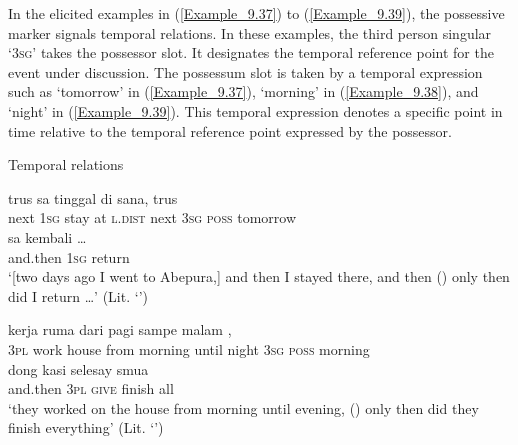 In the elicited examples in (\ref{Example_9.37}) to (\ref{Example_9.39}), the possessive marker signals temporal  relations. In these examples, the third person singular   ‘\textsc{3sg}’ takes the possessor slot. It designates the temporal reference point for the event under discussion. The possessum slot is taken by a temporal expression such as  ‘tomorrow’ in (\ref{Example_9.37}),  ‘morning’ in (\ref{Example_9.38}), and  ‘night’ in (\ref{Example_9.39}). This temporal expression denotes a specific point in time relative to the temporal reference point expressed by the possessor.



\begin{styleExampleTitle}
Temporal  relations
\end{styleExampleTitle}

\ea
\label{Example_9.37}
\gll {\ldots} {trus} {{sa}} {{tinggal}} {{di}} {sana,} {trus} {} {} {}\\ %
 { }  next  {\textsc{1sg}}  {stay}  {at}  \textsc{l.dist}  next  \textsc{3sg}  \textsc{poss}  tomorrow\\
  {sa}  {kembali}  {\ldots}\\
 {and.then}  {\textsc{1sg}}  {return}  {}\\
\glt 
‘[two days ago I went to Abepura,] and then I stayed there, and then  ()  only then did I return {\ldots}’ (Lit. ‘’) \textstyleExampleSource{[Elicited BR111020.008]}
\z

\ea
\label{Example_9.38}
 {{kerja}} {{ruma}} {{dari}} {{pagi}} {sampe} {malam} {} {} {,}\\ %
 \textsc{3pl}  {work}  {house}  {from}  {morning}  until  night  \textsc{3sg}  \textsc{poss}  morning\\
  {dong}  {kasi}  {selesay}  {smua}\\
 {and.then}  {\textsc{3pl}}  {\textsc{give}}  {finish}  {all}\\
\glt 
‘they worked on the house from morning until evening,  ()  only then did they finish everything’ (Lit. ‘’) \textstyleExampleSource{[Elicited BR111020.009]}
\z

